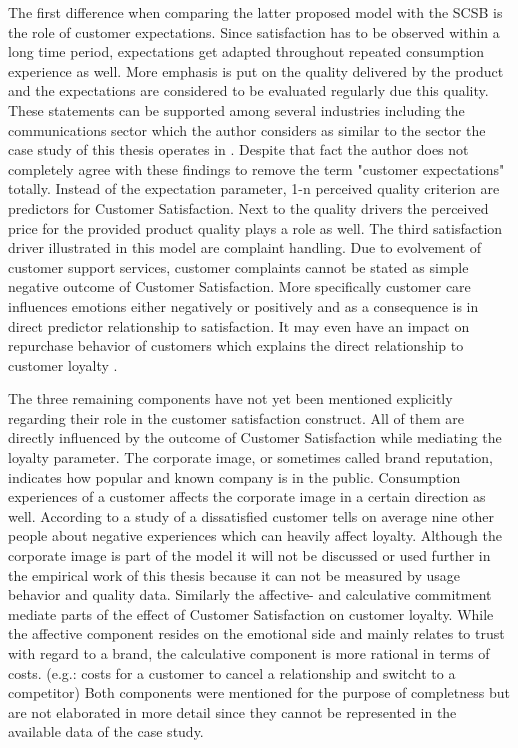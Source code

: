 The first difference when comparing the latter proposed model with the SCSB is the role of customer expectations. Since satisfaction has to be observed within a long time period, expectations get adapted throughout repeated consumption experience as well. More emphasis is put on the quality delivered by the product and the expectations are considered to be evaluated regularly due this quality. These statements can be supported among several industries including the communications sector which the author considers as similar to the sector the case study of this thesis operates in \cite{johnson1996expectations} \cite{fornell1996american}. Despite that fact the author does not completely agree with these findings to remove the term "customer expectations" totally. Instead of the expectation parameter, 1-n perceived quality criterion are predictors for Customer Satisfaction. Next to the quality drivers the perceived price for the provided product quality plays a role as well. The third satisfaction driver illustrated in this model are complaint handling. Due to evolvement of customer support services, customer complaints cannot be stated as simple negative outcome of Customer Satisfaction. More specifically customer care influences emotions either negatively or positively and as a consequence is in direct predictor relationship to satisfaction. It may even have an impact on repurchase behavior of customers which explains the direct relationship to customer loyalty \cite{johnson2001evolution}. 

The three remaining components have not yet been mentioned explicitly regarding their role in the customer satisfaction construct. All of them are directly influenced by the outcome of Customer Satisfaction while mediating the loyalty parameter. The corporate image, or sometimes called brand reputation, indicates how popular and known company is in the public. Consumption experiences of a customer affects the corporate image in a certain direction as well. According to a study of \cite{hussain2015service} a dissatisfied customer tells on average nine other people about negative experiences which can heavily affect loyalty. Although the corporate image is part of the model it will not be discussed or used further in the empirical work of this thesis because it can not be measured by usage behavior and quality data. Similarly the affective- and calculative commitment mediate parts of the effect of Customer Satisfaction on customer loyalty. While the affective component resides on the emotional side and mainly relates to trust with regard to a brand, the calculative component is more rational in terms of costs. (e.g.: costs for a customer to cancel a relationship and switcht to a competitor) \cite{johnson2001evolution} Both components were mentioned for the purpose of completness but are not elaborated in more detail since they cannot be represented in the available data of the case study. 

